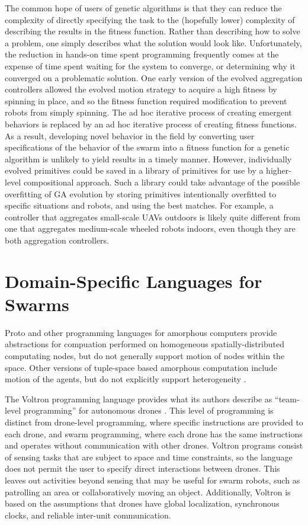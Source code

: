 The common hope of users of genetic algorithms is that they can reduce the complexity of directly specifying the task to the (hopefully lower) complexity of describing the results in the fitness function.
Rather than describing how to solve a problem, one simply describes what the solution would look like. 
Unfortunately, the reduction in hands-on time spent programming frequently comes at the expense of time spent waiting for the system to converge, or determining why it converged on a problematic solution. 
One early version of the evolved aggregation controllers allowed the evolved motion strategy to acquire a high fitness by spinning in place, and so the fitness function required modification to prevent robots from simply spinning. 
The ad hoc iterative process of creating emergent behaviors is replaced by an ad hoc iterative process of creating fitness functions.
As a result, developing novel behavior in the field by converting user specifications of the behavior of the swarm into a fitness function for a genetic algorithm is unlikely to yield results in a timely manner. 
However, individually evolved primitives could be saved in a library of primitives for use by a higher-level compositional approach. 
Such a library could take advantage of the possible overfitting of GA evolution by storing primitives intentionally overfitted to specific situations and robots, and using the best matches. 
For example, a controller that aggregates small-scale UAVs outdoors is likely quite different from one that aggregates medium-scale wheeled robots indoors, even though they are both aggregation controllers. 

\section{Domain-Specific Languages for Swarms}

Proto and other programming languages for amorphous computers provide abstractions for compuation performed on homogeneous spatially-distributed computating nodes, but do not generally support motion of nodes within the space. 
Other versions of tuple-space based amorphous computation include motion of the agents, but do not explicitly support heterogeneity \citep{viroli2012linda}.

The Voltron programming language provides what its authors describe as ``team-level programming'' for autonomous drones \citep{mottola2014team}.
This level of programming is distinct from drone-level programming, where specific instructions are provided to each drone, and swarm programming, where each drone has the same instructions and operates without communication with other drones.
Voltron programs consist of sensing tasks that are subject to space and time constraints, so the language does not permit the user to specify direct interactions between drones. 
This leaves out activities beyond sensing that may be useful for swarm robots, such as patrolling an area or collaboratively moving an object.
Additionally, Voltron is based on the assumptions that drones have global localization, synchronous clocks, and reliable inter-unit communication.   

